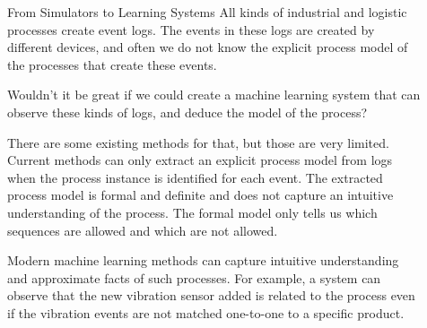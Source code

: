 \documentclass[final]{beamer}
\newlength{\sepwid}
\newlength{\threecolwid}
\begin{document}
\begin{frame}[t]
\begin{columns}[t]
\end{columns}

\begin{columns}[t]

\begin{column}{\sepwid}\end{column} %

\begin{column}{\threecolwid}

\begin{block}{From Simulators to Learning Systems}
All kinds of industrial and logistic processes create event logs. The events in these logs are created by different devices, and often we do not know
the explicit process model of the processes that create these events.

Wouldn't it be great if we could create a machine learning system that can observe these kinds of logs, and deduce the model of the process?

There are some existing methods for that, but those are very limited. Current methods can only extract an explicit process model
from logs when the process instance is identified for each event. The extracted process model is formal and definite and does not capture
an intuitive understanding of the process. The formal model only tells us which sequences are allowed and which are not allowed.

Modern machine learning methods can capture intuitive understanding and approximate facts of such processes. For example, a system can observe that the new vibration sensor added is related to the process
even if the vibration events are not matched one-to-one to a specific product.
\end{block}



\end{column}


\begin{column}{\sepwid}\end{column} %

\end{columns}
\end{frame}


%
\end{document}
